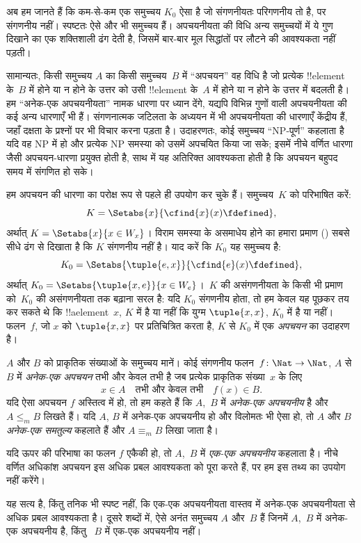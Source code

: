 \documentclass[../../../include/open-logic-section]{subfiles}
\begin{document}

\begin{explain}
अब हम जानते हैं कि कम-से-कम एक समुच्चय $K_0$ ऐसा है जो संगणनीयतः
परिगणनीय तो है, पर संगणनीय नहीं। स्पष्टतः ऐसे और भी समुच्चय हैं।
अपचयनीयता की विधि अन्य समुच्चयों में ये गुण दिखाने का एक शक्तिशाली ढंग
देती है, जिसमें बार-बार मूल सिद्धांतों पर लौटने की आवश्यकता नहीं पड़ती।

सामान्यतः, किसी समुच्चय $A$ का किसी समुच्चय~$B$ में ``अपचयन'' वह विधि
है जो प्रत्येक !!{element} के~$B$ में होने या न होने के उत्तर को उसी
!!{element} के~$A$ में होने या न होने के उत्तर में बदलती है। हम
``अनेक-एक अपचयनीयता'' नामक धारणा पर ध्यान देंगे, यद्यपि विभिन्न गुणों
वाली अपचयनीयता की कई अन्य धारणाएँ भी हैं। संगणनात्मक जटिलता के अध्ययन
में भी अपचयनीयता की धारणाएँ केंद्रीय हैं, जहाँ दक्षता के प्रश्नों पर भी
विचार करना पड़ता है। उदाहरणतः, कोई समुच्चय ``NP-पूर्ण'' कहलाता है यदि वह
NP में हो और प्रत्येक NP समस्या को उसमें अपचयित किया जा सके; इसमें नीचे
वर्णित धारणा जैसी अपचयन-धारणा प्रयुक्त होती है, साथ में यह अतिरिक्त
आवश्यकता होती है कि अपचयन बहुपद समय में संगणित हो सके।

हम अपचयन की धारणा का परोक्ष रूप से पहले ही उपयोग कर चुके हैं। समुच्चय~$K$
को परिभाषित करें:
\[
K = \Setabs{x}{\cfind{x}(x) \fdefined},
\]
अर्थात् $K = \Setabs{x}{x \in W_x}$। विराम समस्या के असमाधेय होने का
हमारा प्रमाण () सबसे सीधे ढंग से दिखाता
है कि $K$ संगणनीय नहीं है। याद करें कि $K_0$ यह समुच्चय है:
\[
K_0 = \Setabs{\tuple{e, x}}{\cfind{e}(x) \fdefined },
\]
अर्थात् $K_0 = \Setabs{\tuple{x,e}}{x \in W_e}$।~$K$ की असंगणनीयता के
किसी भी प्रमाण को~$K_0$ की असंगणनीयता तक बढ़ाना सरल है: यदि $K_0$
संगणनीय होता, तो हम केवल यह पूछकर तय कर सकते थे कि !!a{element}~$x$,
$K$ में है या नहीं कि युग्म $\tuple{x, x}$, $K_0$ में है या नहीं। फलन~$f$,
जो $x$ को $\tuple{x, x}$ पर प्रतिचित्रित करता है, $K$ से $K_0$ में
एक \emph{अपचयन} का उदाहरण है।
\end{explain}

\begin{defn}
$A$ और $B$ को प्राकृतिक संख्याओं के समुच्चय मानें। कोई संगणनीय
फलन~$f\colon \Nat \to \Nat$, $A$ से~$B$ में \emph{अनेक-एक अपचयन} तभी
और केवल तभी है जब प्रत्येक प्राकृतिक संख्या~$x$ के लिए
\[
x \in A \quad \text{तभी और केवल तभी} \quad f(x) \in B.
\]
यदि ऐसा अपचयन $f$ अस्तित्व में हो, तो हम कहते हैं कि $A$,~$B$ में
\emph{अनेक-एक अपचयनीय} है और $A \leq_m B$ लिखते हैं। यदि $A$, $B$ में
अनेक-एक अपचयनीय हो और विलोमतः भी ऐसा हो, तो $A$ और $B$ \emph{अनेक-एक
समतुल्य} कहलाते हैं और $A \equiv_m B$ लिखा जाता है।
\end{defn}

यदि ऊपर की परिभाषा का फलन $f$ एकैकी हो, तो $A$,~$B$ में \emph{एक-एक
अपचयनीय} कहलाता है। नीचे वर्णित अधिकांश अपचयन इस अधिक प्रबल आवश्यकता
को पूरा करते हैं, पर हम इस तथ्य का उपयोग नहीं करेंगे।

\begin{digress}
यह सत्य है, किंतु तनिक भी स्पष्ट नहीं, कि एक-एक अपचयनीयता वास्तव में
अनेक-एक अपचयनीयता से अधिक प्रबल आवश्यकता है। दूसरे शब्दों में, ऐसे अनंत
समुच्चय $A$ और~$B$ हैं जिनमें $A$,~$B$ में अनेक-एक अपचयनीय है, किंतु
~$B$ में एक-एक अपचयनीय नहीं।
\end{digress}
\end{document}
